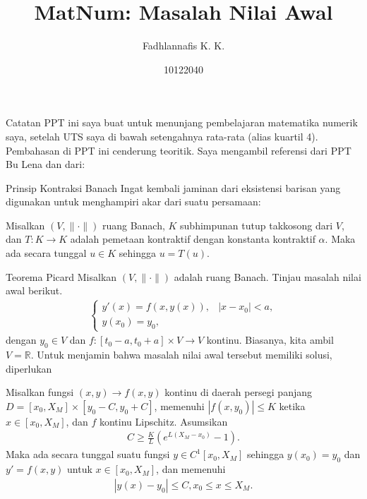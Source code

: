 \documentclass[xcolor={dvipsnames}, 9pt]{beamer}
\title{MatNum: Masalah Nilai Awal}
\author{Fadhlannafis K. K.}
\date{10122040}
\begin{document}
	\begin{frame}[plain]
		\maketitle
	\end{frame}
	\begin{frame}{Catatan}
		PPT ini saya buat untuk menunjang pembelajaran matematika numerik saya, setelah UTS saya di bawah setengahnya rata-rata (alias kuartil 4). \newline
		Pembahasan di PPT ini cenderung teoritik. Saya mengambil referensi dari PPT Bu Lena dan dari:
		\nocite{*}
		\printbibliography
	\end{frame}
    \begin{frame}{Prinsip Kontraksi Banach}
        Ingat kembali jaminan dari eksistensi barisan yang digunakan untuk menghampiri akar dari suatu persamaan:
        \begin{theorem}
            Misalkan $(V,\|\cdot\|)$ ruang Banach, $K$ subhimpunan tutup takkosong dari $V$, dan $T:K\to K$ adalah pemetaan kontraktif dengan konstanta kontraktif $\alpha$. Maka ada secara tunggal $u\in K$ sehingga $u=T(u)$. 
        \end{theorem}
    \end{frame}
    \begin{frame}{Teorema Picard}
        Misalkan $(V,\|\cdot\|)$ adalah ruang Banach. Tinjau masalah nilai awal berikut.
        \begin{align}\label{ivp}
            \begin{cases}
                y'(x) = f(x,y(x)), & |x-x_0| < a, \\
                y(x_0) = y_0,
            \end{cases}
        \end{align}
        dengan $y_0\in V$ dan $f:[t_0-a,t_0+a]\times V\to V$ kontinu. Biasanya, kita ambil $V=\mathbb{R}$. Untuk menjamin bahwa masalah nilai awal tersebut memiliki solusi, diperlukan
        \begin{theorem}[Picard]
            Misalkan fungsi $(x,y)\to f(x,y)$ kontinu di daerah persegi panjang $D = [x_0,X_M] \times [y_0-C, y_0+C]$, memenuhi $|f(x,y_0)|\leq K$ ketika $x\in[x_0,X_M]$, dan $f$ kontinu Lipschitz. Asumsikan
            \begin{align*}
                C\geq \frac{K}{L}\left(e^{L(X_M-x_0)}-1\right).
            \end{align*}
            Maka ada secara tunggal suatu fungsi $y\in C^1[x_0,X_M]$ sehingga $y(x_0)=y_0$ dan $y'=f(x,y)$ untuk $x\in [x_0, X_M]$, dan memenuhi
            \begin{align*}
                |y(x)-y_0|\leq C, x_0\leq x\leq X_M.
            \end{align*}
        \end{theorem}
    \end{frame}
\end{document}
